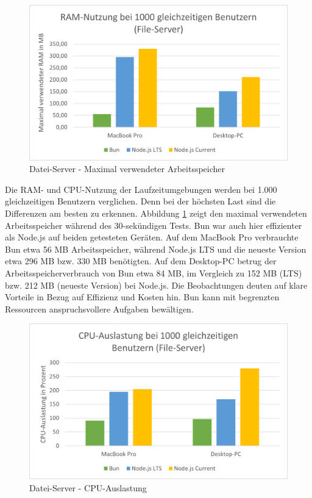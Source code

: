 \begin{figure}[h!]
	\centering
	\includegraphics[width=\linewidth]{./images/fileServerRamUsage.png}
	\caption{Datei-Server - Maximal verwendeter Arbeitsspeicher}
	\label{fig:fileServerRamUsage}
\end{figure}


\noindent
Die RAM- und CPU-Nutzung der Laufzeitumgebungen werden bei 1.000 gleichzeitigen Benutzern verglichen. Denn bei der höchsten Last sind die Differenzen am besten zu erkennen. Abbildung \ref{fig:fileServerRamUsage} zeigt den maximal verwendeten Arbeitsspeicher während des 30-sekündigen Tests. Bun war auch hier effizienter als Node.js auf beiden getesteten Geräten. Auf dem MacBook Pro verbrauchte Bun etwa 56 MB Arbeitsspeicher, während Node.js LTS und die neueste Version etwa 296 MB bzw. 330 MB benötigten. Auf dem Desktop-PC betrug der Arbeitsspeicherverbrauch von Bun etwa 84 MB, im Vergleich zu 152 MB (LTS) bzw. 212 MB (neueste Version) bei Node.js. Die Beobachtungen deuten auf klare Vorteile in Bezug auf Effizienz und Kosten hin. Bun kann mit begrenzten Ressourcen anspruchsvollere Aufgaben bewältigen.\\

\begin{figure}[h!]
	\centering
	\includegraphics[width=\linewidth]{./images/fileServerCpuUsage.png}
	\caption{Datei-Server - CPU-Auslastung }
	\label{fig:fileServerCpuUsage}
\end{figure}

